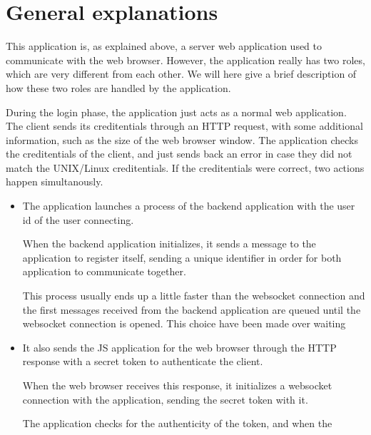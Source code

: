 \section{General explanations}
% 
This application is, as explained above, a server web application used to 
communicate with the web browser. However, the application really has two 
roles, which are very different from each other. We will here give a brief 
description of how these two roles are handled by the application.

During the login phase, the application just acts as a normal web 
application. The client sends its creditentials through an HTTP request,
with some additional information, such as the size of the web browser 
window. The application checks the creditentials of the client, and 
just sends back an error in case they did not match the UNIX/Linux 
creditentials. If the creditentials were correct, two actions happen 
simultanously. 
\begin{itemize}
\item The application launches a process of the backend 
  application with the user id of the user connecting.
  
  When the backend application initializes, it sends a message to 
  the application to register itself, sending a unique identifier 
  in order for both application to communicate together. 

  This process usually ends up a little faster than the websocket connection and 
  the first messages received from the backend application are queued until 
  the websocket connection is opened. This choice have been made over waiting 
\item It also sends the JS application for the web browser through the HTTP 
  response with a secret token to authenticate the client. 
  
  When the web browser receives this response, it initializes a websocket 
  connection with the application, sending the secret token with it. 

  The application checks for the authenticity of the token, and when the 
\end{itemize}



